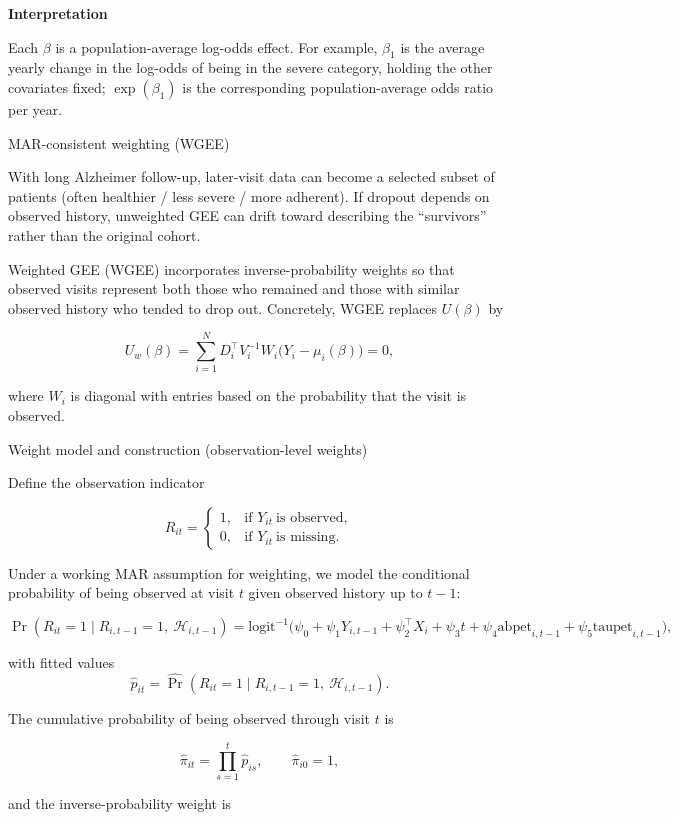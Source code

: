 \documentclass[
  9pt,
  letterpaper,
  DIV=11,
  numbers=noendperiod]{scrartcl}
\begin{document}
\textbf{Interpretation}

Each \(\beta\) is a population-average log-odds effect. For example,
\(\beta_1\) is the average yearly change in the log-odds of being in the
severe category, holding the other covariates fixed; \(\exp(\beta_1)\)
is the corresponding population-average odds ratio per year.

MAR-consistent weighting (WGEE)

With long Alzheimer follow-up, later-visit data can become a selected
subset of patients (often healthier / less severe / more adherent). If
dropout depends on observed history, unweighted GEE can drift toward
describing the ``survivors'' rather than the original cohort.

Weighted GEE (WGEE) incorporates inverse-probability weights so that
observed visits represent both those who remained and those with similar
observed history who tended to drop out. Concretely, WGEE replaces
\(U(\beta)\) by

\[
U_w(\beta)=\sum_{i=1}^{N} D_i^\top V_i^{-1} W_i\big(Y_i-\mu_i(\beta)\big)=0,
\]

where \(W_i\) is diagonal with entries based on the probability that the
visit is observed.

Weight model and construction (observation-level weights)

Define the observation indicator

\[
R_{it}=
\begin{cases}
1, & \text{if } Y_{it}\ \text{is observed},\\
0, & \text{if } Y_{it}\ \text{is missing}.
\end{cases}
\]

Under a working MAR assumption for weighting, we model the conditional
probability of being observed at visit \(t\) given observed history up
to \(t-1\):

\[
\Pr(R_{it}=1 \mid R_{i,t-1}=1,\ \mathcal{H}_{i,t-1})
=
\text{logit}^{-1}\Big(
\psi_0
+ \psi_1 Y_{i,t-1}
+ \psi_2^\top X_i
+ \psi_3 t
+ \psi_4 \text{abpet}_{i,t-1}
+ \psi_5 \text{taupet}_{i,t-1}
\Big),
\]

with fitted values \[
\hat{p}_{it}=\widehat{\Pr}(R_{it}=1 \mid R_{i,t-1}=1,\ \mathcal{H}_{i,t-1}).
\]

The cumulative probability of being observed through visit \(t\) is

\[
\hat{\pi}_{it}=\prod_{s=1}^{t}\hat{p}_{is},
\qquad \hat{\pi}_{i0}=1,
\]

and the inverse-probability weight is
\end{document}
